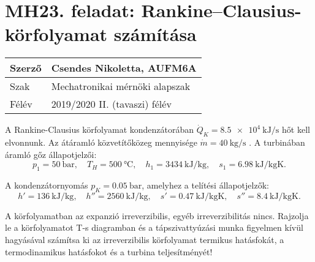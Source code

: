\pagebreak
\section*{MH23. feladat: Rankine--Clausius-körfolyamat számítása}


\begin{tabular}{ | p{2cm} | p{14cm} | } 
	\hline
	Szerző & Csendes Nikoletta, AUFM6A \\ 
	\hline
	Szak & Mechatronikai mérnöki alapszak \\ 
	\hline
	Félév & 2019/2020 II. (tavaszi) félév \\ 
	\hline
\end{tabular}
\vspace{0.5cm}

\noindent A Rankine-Clausius körfolyamat kondenzátorában 
$\dot{Q}_{K} = \SI{8.5e4}{\kilo\joule\per\second}$ 
hőt kell elvonnunk. Az átáramló közvetítőközeg mennyisége 
$\dot{m} = \SI{40}{\kilogram\per\second}$
 . A turbinában áramló gőz állapotjelzői: \\
 
 \begin{equation*}
 	p_1 = \SI{50}{\bar}, 
 	\quad 
 	T_H = \SI{500}{\celsius}, 
 	\quad
 	h_1 = \SI{3434}{\kilo\joule\per\kilogram},
 	\quad
 	s_1 = \SI{6.98}{\kilo\joule\per\kilogram\kelvin}.
 \end{equation*}

\noindent A kondenzátornyomás ${p}_{K} = \SI{0.05}{\bar}$, amelyhez a telítési állapotjelzők:\\

\begin{equation*}
	h' = \SI{136}{\kilo\joule\per\kilogram}, 
	\quad 
	h'' = \SI{2560}{\kilo\joule\per\kilogram}, 
	\quad
	s' = \SI{0.47}{\kilo\joule\per\kilogram\kelvin},
	\quad
	s'' = \SI{8.4}{\kilo\joule\per\kilogram\kelvin}.
\end{equation*}

\noindent A körfolyamatban az expanzió irreverzibilis, egyéb irreverzibilitás nincs. Rajzolja le a körfolyamatot T-s diagramban és a tápszivattyúzási munka figyelmen kívül hagyásával számítsa ki az irreverzibilis körfolyamat termikus hatásfokát, a termodinamikus hatásfokot és a turbina teljesítményét! \\

